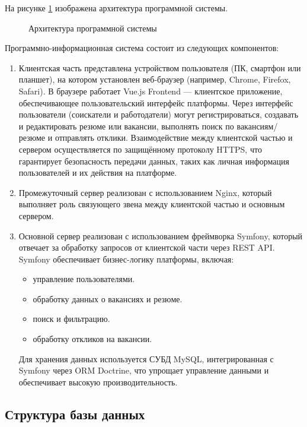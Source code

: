 На рисунке \ref{dc:image} изображена архитектура программной системы.

\begin{figure}[ht]
\center{\texttt{[image: dc]}}
\caption{Архитектура программной системы}
\label{dc:image}
\end{figure}

Программно-информационная система состоит из следующих компонентов:

\begin{enumerate}
	\item Клиентская часть представлена устройством пользователя (ПК, смартфон или планшет), на котором установлен веб-браузер (например, Chrome, Firefox, Safari). В браузере работает Vue.js Frontend — клиентское приложение, обеспечивающее пользовательский интерфейс платформы. Через интерфейс пользователи (соискатели и работодатели) могут регистрироваться, создавать и редактировать резюме или вакансии, выполнять поиск по вакансиям/резюме и отправлять отклики. Взаимодействие между клиентской частью и сервером осуществляется по защищённому протоколу HTTPS, что гарантирует безопасность передачи данных, таких как личная информация пользователей и их действия на платформе.
	\item Промежуточный сервер реализован с использованием Nginx, который выполняет роль связующего звена между клиентской частью и основным сервером.
	\item Основной сервер реализован с использованием фреймворка Symfony, который отвечает за обработку запросов от клиентской части через REST API. Symfony обеспечивает бизнес-логику платформы, включая:
	
	\begin{itemize}
		\item управление пользователями.
		\item обработку данных о вакансиях и резюме.
		\item поиск и фильтрацию.
		\item обработку откликов на вакансии.
	\end{itemize}
	
	Для хранения данных используется СУБД MySQL, интегрированная с Symfony через ORM Doctrine, что упрощает управление данными и обеспечивает высокую производительность.
\end{enumerate}

\subsection{Структура базы данных}

